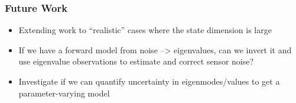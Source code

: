 \documentclass[9pt]{beamer}
\begin{document}
\begin{frame}
\frametitle{Future Work}
\label{sec-3-4}

\begin{itemize}
\item Extending work to ``realistic'' cases where the state dimension is large
\item If we have a forward model from noise --> eigenvalues, can we
  invert it and use eigenvalue observations to estimate and correct
  sensor noise?
\item Investigate if we can quantify uncertainty in eigenmodes/values to
  get a parameter-varying model
\end{itemize}
\end{frame}
\end{document}
